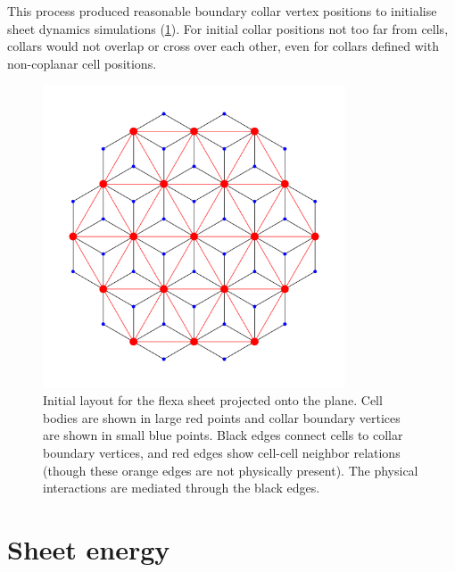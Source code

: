 This process produced reasonable boundary collar vertex positions to initialise sheet dynamics simulations (\cref{fig:layout_init}). 
For initial collar positions not too far from cells, collars would not overlap or cross over each other, even for collars defined with non-coplanar cell positions. 


\begin{figure}[hbtp]
    \centering
    \includegraphics[width=0.8\textwidth]{layout_init.png}
    \caption[Initial layout of the hexagonal lattice flexa sheet]{Initial layout for the flexa sheet projected onto the plane. Cell bodies are shown in large red points and collar boundary vertices are shown in small blue points. Black edges connect cells to collar boundary vertices, and red edges show cell-cell neighbor relations (though these orange edges are not physically present). The physical interactions are mediated through the black edges.}
    \label{fig:layout_init}
\end{figure}

\section{Sheet energy}

